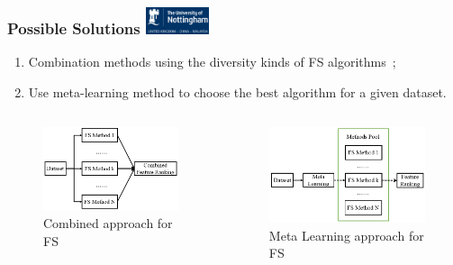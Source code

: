 \documentclass[aspectratio=1610]{beamer}
\newcommand{\UoN}
  {\hfill {\includegraphics[height=0.8cm]{nott_logo/nott_logo_white.png}}}
\begin{document}
\begin{frame}
\frametitle{Possible Solutions \UoN}

\begin{enumerate}
	\item Combination methods using the diversity kinds of FS algorithms~;
	\item Use meta-learning method to choose the best algorithm for a given dataset.
\end{enumerate}

\begin{columns}
	\begin{column}{0.5\textwidth}
		\begin{figure}
			\includegraphics[scale=0.4]{Figures/Combined_FS.png}
			\caption{\scriptsize{Combined approach for FS}}
		\end{figure}
	\end{column}

	\begin{column}{0.5\textwidth}
		\begin{figure}
			\includegraphics[scale=0.4]{Figures/Meta_FS.png}
			\caption{\scriptsize{Meta Learning approach for FS}}
		\end{figure}
	\end{column}

\end{columns}

\end{frame}
\end{document}
